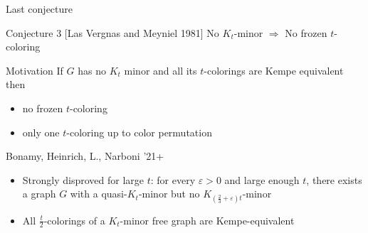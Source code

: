\documentclass[11pt,xcolor=dvipsnames,presentation]{beamer}
\begin{document}
\begin{frame}{Last conjecture}
  \begin{alertblock}{Conjecture 3 [Las Vergnas and Meyniel 1981]}
    No $K_t$-minor $\Rightarrow$ No frozen $t$-coloring
  \end{alertblock}
  \begin{block}{Motivation}
    If $G$ has no $K_t$ minor and all its $t$-colorings are Kempe equivalent
    then
    \begin{itemize}
    \item no frozen $t$-coloring
    \item only one $t$-coloring up to color permutation
    \end{itemize}
  \end{block}
  \pause
  \begin{block}{Bonamy, Heinrich, L., Narboni '21+}
    \begin{itemize}
    \item Strongly disproved for large $t$: for every $\varepsilon >0$ and large
      enough $t$, there exists a graph $G$ with a quasi-$K_t$-minor but no
      $K_{\left(\frac{2}{3} + \varepsilon\right)t}$-minor
      \pause
    \item All $\frac{t}{2}$-colorings of a $K_t$-minor free graph are
      Kempe-equivalent
    \end{itemize}
  \end{block}
\end{frame}
\end{document}
